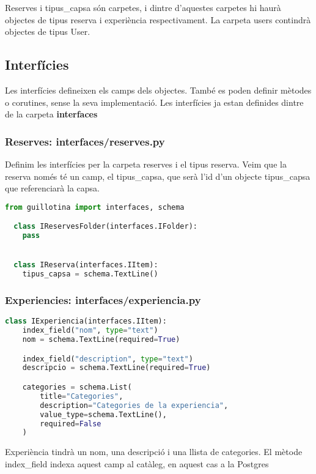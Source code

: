 \documentclass[a4paper, 11pt]{article}
\begin{document}
Reserves i tipus\_capsa són carpetes, i dintre d'aquestes carpetes hi
haurà objectes de tipus reserva i experiència respectivament. La
carpeta users contindrà objectes de tipus User.

\subsection{Interfícies}
Les interfícies defineixen els camps dels objectes. També es poden
definir mètodes o corutines, sense la seva implementació. Les
interfícies ja estan definides dintre de la carpeta
\textbf{interfaces}

\subsubsection{Reserves: interfaces/reserves.py}
Definim les interfícies per la carpeta reserves i el tipus
reserva. Veim que la reserva només té un camp, el tipus\_capsa, que
serà l'id d'un objecte tipus\_capsa que referenciarà la capsa.
\begin{lstlisting}[language=Python, caption=Estructura dades]
  from guillotina import interfaces, schema

  class IReservesFolder(interfaces.IFolder):
    pass


  class IReserva(interfaces.IItem):
    tipus_capsa = schema.TextLine()
  \end{lstlisting}


\subsubsection{Experiencies: interfaces/experiencia.py}
\begin{lstlisting}[language=Python, caption=Estructura dades]
  class IExperiencia(interfaces.IItem):
    index_field("nom", type="text")
    nom = schema.TextLine(required=True)

    index_field("description", type="text")
    descripcio = schema.TextLine(required=True)

    categories = schema.List(
        title="Categories",
        description="Categories de la experiencia",
        value_type=schema.TextLine(),
        required=False
    )
  \end{lstlisting}
  Experiència tindrà un nom, una descripció i una llista de
  categories. El mètode index\_field indexa aquest camp al catàleg, en
  aquest cas a la Postgres
\end{document}
